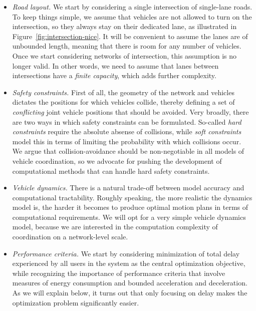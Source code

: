 \documentclass[a4paper]{report}
\theoremstyle{definition}
\theoremstyle{plain}
\begin{document}
\begin{itemize}

  \item \emph{Road layout.}
        We start by considering a single intersection of single-lane roads. To
        keep things simple, we assume that vehicles are not allowed to turn on
        the intersection, so they always stay on their dedicated lane, as
        illustrated in Figure~\ref{fig:intersection-nice}.
        It will be convenient to assume the lanes are of unbounded length,
        meaning that there is room for any number of vehicles. Once we start
        considering networks of intersection, this assumption is no longer
        valid. In other words, we need to assume that lanes between
        intersections have a \emph{finite capacity}, which adds further
        complexity.
  
  \item \emph{Safety constraints.}
        First of all, the geometry of the network and vehicles dictates the
        positions for which vehicles collide, thereby defining a set of
        \emph{conflicting} joint vehicle positions that should be avoided.
        Very broadly, there are two ways in which safety constraints can be formulated.
        So-called \emph{hard constraints} require the absolute absense of collisions,
        while \emph{soft constraints} model this in terms of limiting the probability
        with which collisions occur.
        We argue that collision-avoidance should be non-negotiable in all models of
        vehicle coordination, so we advocate for pushing the development of
        computational methods that can handle hard safety constraints.

  \item \emph{Vehicle dynamics.}
        There is a natural trade-off between model accuracy and computational
        tractability. Roughly speaking, the more realistic the dynamics model
        is, the harder it becomes to produce optimal motion plans in terms of
        computational requirements.
        We will opt for a very simple vehicle dynamics model, because we are
        interested in the computation complexity of coordination on a
        network-level scale.

  \item \emph{Performance criteria.}
        We start by considering minimization of total delay experienced by all
        users in the system as the central optimization objective, while
        recognizing the importance of performance criteria that involve measures
        of energy consumption and bounded acceleration and deceleration.
        As we will explain below, it turns out that only focusing on delay makes
        the optimization problem significantly easier.
\end{itemize}
\end{document}
